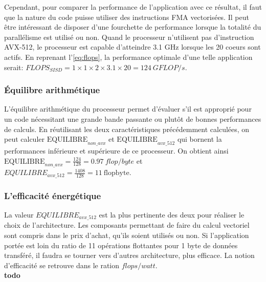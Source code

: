 Cependant, pour comparer la performance de l'application avec ce résultat, il faut que la nature du code puisse utiliser des instructions FMA vectorisées. Il peut être intéressant de disposer d'une fourchette de performance lorsque la totalité du parallélisme est utilisé ou non. Quand le processeur n'utilisent pas d'instruction AVX-512, le processeur est capable d'atteindre 3.1 GHz lorsque les 20 coeurs sont actifs. En reprenant l'\autoref{eq:flops}, la performance optimale d'une telle application serait: $FLOPS_{SISD} = 1 \times 1 \times 2 \times 3.1 \times 20 = 124 \ GFLOP/s$.

\subsubsection{Équilibre arithmétique}
L'équilibre arithmétique du processeur permet d'évaluer s'il est approprié pour un code nécessitant une grande bande passante ou plutôt de bonnes performances de calculs. En réutilisant les deux caractéristiques précédemment calculées, on peut calculer $\text{EQUILIBRE}_{non\_avx}$ et $\text{EQUILIBRE}_{avx\_512}$ qui bornent la performances inférieure et supérieure de ce processeur. On obtient ainsi $\text{EQUILIBRE}_{non\_avx} = \frac{124}{128} = 0.97\ flop/byte$ et $EQUILIBRE_{avx\_512} = \frac{1408}{128} = 11\ \text{flopbyte}$. 
 

\subsubsection{L'efficacité énergétique}

La valeur  $EQUILIBRE_{avx\_512}$ est la plus pertinente des deux pour réaliser le choix de l'architecture. Les composants permettant de faire du calcul vectoriel sont compris dans le prix d'achat, qu'ils soient utilisés ou non. Si l'application portée est loin du ratio de 11 opérations flottantes pour 1 byte de données transféré, il faudra se tourner vers d'autres architecture, plus efficace. La notion d'efficacité se retrouve dans le ration $flops/watt$.
\\
\textbf{todo}






















